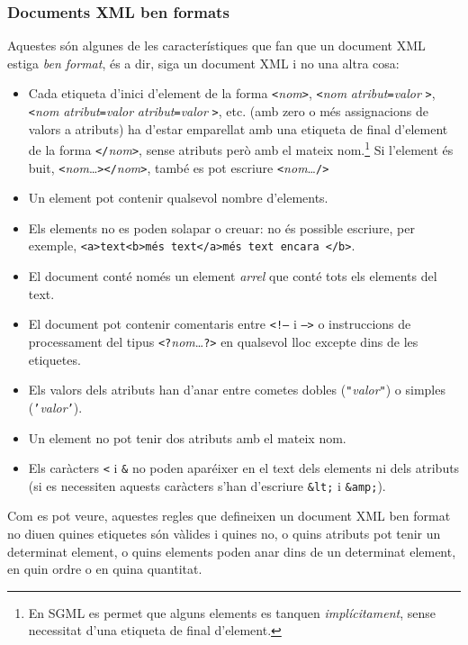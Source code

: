 
\subsubsection{Documents XML ben formats}

Aquestes són algunes de les característiques que fan que un document
XML estiga \emph{ben format}, és a dir, siga un document XML i no una
altra cosa:
\begin{itemize}
\item Cada etiqueta d'inici d'element de la forma
  \texttt{<}\emph{nom}\texttt{>}, \texttt{<}\emph{nom}
  \emph{atribut}\texttt{=}\emph{valor} \texttt{>},
  \texttt{<}\emph{nom} \emph{atribut}\texttt{=}\emph{valor}
  \emph{atribut}\texttt{=}\emph{valor} \texttt{>}, etc. (amb zero o
  més assignacions de valors a atributs) ha d'estar emparellat amb una
  etiqueta de final d'element de la forma
  \texttt{</}\emph{nom}\texttt{>}, sense atributs però amb el mateix
  nom.\footnote{En SGML es permet que alguns elements es tanquen
    \emph{implícitament}, sense necessitat d'una etiqueta de final
    d'element.} Si l'element és buit,
  \texttt{<}\emph{nom}\ldots\texttt{></}\emph{nom}\texttt{>}, també es
  pot escriure \texttt{<}\emph{nom}\ldots\texttt{/>}
\item Un element pot contenir qualsevol nombre d'elements.
\item Els elements no es poden solapar o creuar: no és possible
  escriure, per exemple, \texttt{<a>text<b>més text</a>més text encara
    </b>}.
\item El document conté només un element \emph{arrel} que conté tots
  els elements del text.
\item El document pot contenir comentaris entre \texttt{<!--} i
  \texttt{-->} o instruccions de processament del tipus
  \texttt{<?}\emph{nom}\ldots\texttt{?>} en qualsevol lloc excepte dins
  de les etiquetes.
\item Els valors dels atributs han d'anar entre cometes dobles
  (\texttt{"}\emph{valor}\texttt{"}) o simples
  (\texttt{'}\emph{valor}\texttt{'}).
\item Un element no pot tenir dos atributs amb el mateix nom.
\item Els caràcters \texttt{<} i \texttt{\&} no poden aparéixer en el
  text dels elements ni dels atributs (si es necessiten aquests
  caràcters s'han d'escriure \texttt{\&lt;} i \texttt{\&amp;}). 
\end{itemize}
Com es pot veure, aquestes regles que defineixen un document XML ben
format no diuen quines etiquetes són vàlides i quines no, o quins
atributs pot tenir un determinat element, o quins elements poden anar
dins de un determinat element, en quin ordre o en quina
quantitat. 

